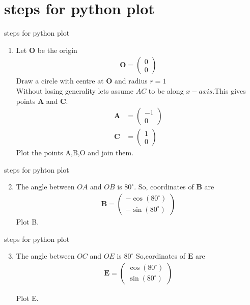 \documentclass{beamer}
\let\vec\mathbf
\newcommand{\myvec}[1]{\ensuremath{\begin{pmatrix}#1\end{pmatrix}}}
\begin{document}
       \section{steps for python plot}
       \begin{frame}{steps for python plot}
       \begin{enumerate}
    \item Let $\vec{O}$ be the origin \\ 
              \begin{align}
               \vec{O}=\myvec{0\\0}
               \end{align}
               Draw a circle with centre at $\vec{O}$ and radius $r=1$\\
  Without losing generality lets assume $AC$ to be along $x-axis$.This gives points $\vec{A}$ and $\vec{C}$.
  \begin{align}
      \vec{A}&=\myvec{-1\\0}\\
      \vec{C}&=\myvec{1\\0}
  \end{align}
  Plot the points A,B,O and join them.
  \end{enumerate}
       \end{frame}
       
       \begin{frame}{steps for pyhton plot}
       \begin{enumerate}
           \setcounter{enumi}{1}
             \item The angle between $OA$ and $OB$ is $80^{\circ}$.
   So, coordinates of $\vec{B}$ are \\
   \begin{align}
       \vec{B}=\myvec{-\cos(80^{\circ})\\-\sin(80^{\circ})}
   \end{align}
   Plot B.
       \end{enumerate}
       \end{frame}
        
        \begin{frame}{steps for python plot}
        \begin{enumerate}
            \setcounter{enumi}{2}
               \item The angle between $OC$ and $OE$ is $80^{\circ}$
   So,cordinates of $\vec{E}$ are
   \begin{align}
       \vec{E}=\myvec{\cos(80^{\circ})\\\sin(80^{\circ})}
   \end{align}
   
   Plot E.
        \end{enumerate}
                \end{frame}
                
\end{document}
